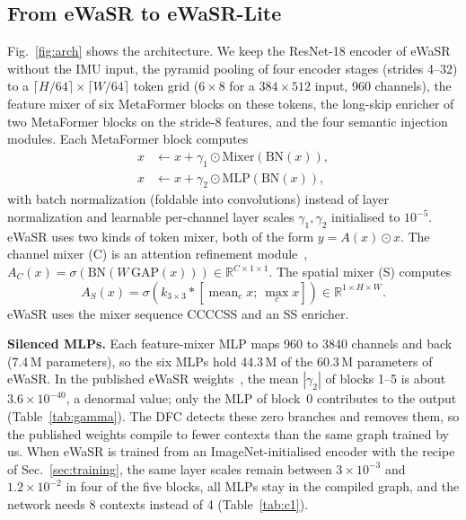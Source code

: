 \documentclass[conference]{IEEEtran}
\begin{document}
\subsection{From eWaSR to eWaSR-Lite}
\label{sec:lite}
Fig.~\ref{fig:arch} shows the architecture. We keep the ResNet-18 encoder of eWaSR without the IMU input, the pyramid pooling of four encoder stages (strides 4--32) to a $\lceil H/64\rceil\times\lceil W/64\rceil$ token grid ($6\times8$ for a $384\times512$ input, 960 channels), the feature mixer of six MetaFormer blocks on these tokens, the long-skip enricher of two MetaFormer blocks on the stride-8 features, and the four semantic injection modules. Each MetaFormer block computes
\begin{align}
x &\leftarrow x + \gamma_1 \odot \mathrm{Mixer}(\mathrm{BN}(x)),\\
x &\leftarrow x + \gamma_2 \odot \mathrm{MLP}(\mathrm{BN}(x)),
\end{align}
with batch normalization (foldable into convolutions) instead of layer normalization and learnable per-channel layer scales $\gamma_1,\gamma_2$ initialised to $10^{-5}$. eWaSR uses two kinds of token mixer, both of the form $y = A(x)\odot x$. The channel mixer (C) is an attention refinement module~\cite{yu2018bisenet}, $A_C(x)=\sigma(\mathrm{BN}(W\,\mathrm{GAP}(x)))\in\mathbb{R}^{C\times1\times1}$. The spatial mixer (S) computes
\begin{equation}
A_S(x)=\sigma\!\left(k_{3\times3} * \left[\operatorname{mean}_c x;\ \operatorname{max}_c x\right]\right)\in\mathbb{R}^{1\times H\times W}.
\end{equation}
eWaSR uses the mixer sequence CCCCSS and an SS enricher.

\textbf{Silenced MLPs.} Each feature-mixer MLP maps 960 to 3840 channels and back (7.4\,M parameters), so the six MLPs hold 44.3\,M of the 60.3\,M parameters of eWaSR. In the published eWaSR weights~\cite{tersek2023ewasr}, the mean $|\gamma_2|$ of blocks 1--5 is about $3.6\times10^{-40}$, a denormal value; only the MLP of block~0 contributes to the output (Table~\ref{tab:gamma}). The DFC detects these zero branches and removes them, so the published weights compile to fewer contexts than the same graph trained by us. When eWaSR is trained from an ImageNet-initialised encoder with the recipe of Sec.~\ref{sec:training}, the same layer scales remain between $3\times10^{-3}$ and $1.2\times10^{-2}$ in four of the five blocks, all MLPs stay in the compiled graph, and the network needs 8 contexts instead of 4 (Table~\ref{tab:c1}).
\end{document}
